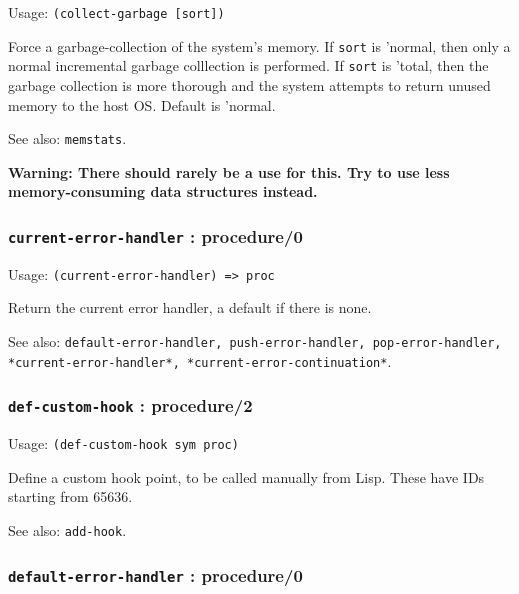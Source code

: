 \documentclass[
]{article}
\newcommand{\passthrough}[1]{#1}
\begin{document}
Usage: \passthrough{\lstinline!(collect-garbage [sort])!}

Force a garbage-collection of the system's memory. If
\passthrough{\lstinline!sort!} is 'normal, then only a normal
incremental garbage colllection is performed. If
\passthrough{\lstinline!sort!} is 'total, then the garbage collection is
more thorough and the system attempts to return unused memory to the
host OS. Default is 'normal.

See also: \passthrough{\lstinline!memstats!}.

\textbf{Warning: There should rarely be a use for this. Try to use less
memory-consuming data structures instead.}

\hypertarget{current-error-handler-procedure0}{%
\subsubsection{\texorpdfstring{\texttt{current-error-handler} :
procedure/0}{current-error-handler : procedure/0}}\label{current-error-handler-procedure0}}

Usage: \passthrough{\lstinline!(current-error-handler) => proc!}

Return the current error handler, a default if there is none.

See also:
\passthrough{\lstinline!default-error-handler, push-error-handler, pop-error-handler, *current-error-handler*, *current-error-continuation*!}.

\hypertarget{def-custom-hook-procedure2}{%
\subsubsection{\texorpdfstring{\texttt{def-custom-hook} :
procedure/2}{def-custom-hook : procedure/2}}\label{def-custom-hook-procedure2}}

Usage: \passthrough{\lstinline!(def-custom-hook sym proc)!}

Define a custom hook point, to be called manually from Lisp. These have
IDs starting from 65636.

See also: \passthrough{\lstinline!add-hook!}.

\hypertarget{default-error-handler-procedure0}{%
\subsubsection{\texorpdfstring{\texttt{default-error-handler} :
procedure/0}{default-error-handler : procedure/0}}\label{default-error-handler-procedure0}}
\end{document}

